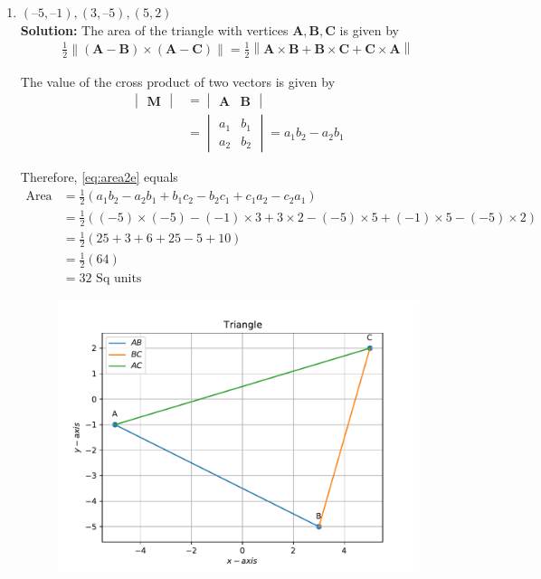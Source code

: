 \documentclass[12pt]{article}
\let\vec\mathbf
\newcommand{\mydet}[1]{\ensuremath{\begin{vmatrix}#1\end{vmatrix}}}
\providecommand{\brak}[1]{\ensuremath{\left(#1\right)}}
\providecommand{\norm}[1]{\left\lVert#1\right\rVert}
\newcommand{\solution}{\noindent \textbf{Solution: }}
\begin{document}
\begin{enumerate}
\begin{enumerate}
\item $(–5, –1), (3, –5), (5, 2)$ \\ 
\solution The area of the triangle with vertices $\vec{A}, \vec{B}, \vec{C}$ is given by  
  \label{prop:area2e}
  \begin{align}
    \label{eq:area2e}
	\frac{1}{2}\norm{\brak{\vec{A}-\vec{B}} \times \brak{\vec{A}-\vec{C}}}
 = 
 \frac{1}{2}\norm{\vec{A} \times \vec{B}+\vec{B} \times \vec{C}+\vec{C} \times \vec{A}}
\end{align}

The value of the cross product of two vectors is given by \\

\begin{align}
  \label{eq:det2e}
  \mydet{\vec{M}} &= \mydet{\vec{A} & \vec{B}} 
  \\
  &= \mydet{a_1 & b_1\\a_2 & b_2} = a_1b_2 - a_2 b_1
\end{align}

		Therefore, \eqref{eq:area2e} equals \\
\begin{align}
	\text{Area} &=	\frac{1}{2}\brak{a_1b_2 - a_2 b_1 + b_1c_2 - b_2 c_1 + c_1a_2 - c_2 a_1}  \\
	&=	\frac{1}{2}\brak{\brak{-5} \times \brak{-5} - \brak{-1} \times 3 + 3 \times 2 - \brak{-5} \times 5 + \brak{-1} \times 5 - \brak{-5} \times 2}  \\
	&=\frac{1}{2}\brak{25 + 3  + 6 + 25 - 5 + 10} \\
	&=\frac{1}{2}\brak{64}  \\
	&=32 \text{ Sq units}	       
\end{align}

\begin{figure}[!h]
	\begin{center}
		\includegraphics[width=\columnwidth]{./figs/problem1b.pdf}
	\end{center}
\caption{}
\label{fig:Fig2}
\end{figure}
\end{enumerate}

\end{enumerate}
\end{document}

